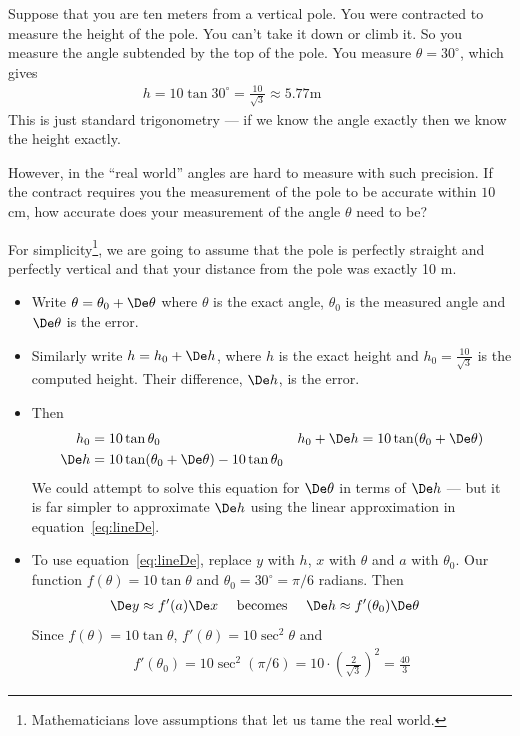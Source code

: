 \begin{eg}\label{eg:taylorPole}
Suppose that you are ten meters from a vertical pole. You were
contracted to measure the height of the pole. You can't
take it down or climb it. So you measure the angle subtended by
the top of the pole. You measure $\theta=30^\circ$,  which gives
\begin{align*}
h=10\tan 30^\circ=\tfrac{10}{\sqrt{3}}\approx 5.77\text{m}\qquad\qquad
\end{align*}
This is just standard trigonometry ---  if we know the angle exactly then we know the
height exactly.

However, in the ``real world'' angles are hard to measure with such precision. If the
contract requires you the measurement of the pole to be accurate within $10$ cm, how
accurate does your measurement of the angle $\theta$ need to be?

\soln For simplicity\footnote{Mathematicians love assumptions that let us tame the real
world.}, we are going to assume that the pole is perfectly straight
and perfectly vertical and that your distance from the pole was exactly
10 m.
\begin{itemize}
\item Write $\theta=\theta_0+\De\theta$ where $\theta$ is the exact angle, $\theta_0$ is
the measured angle and $\De \theta$ is the error.
\item Similarly write $h=h_0+\De h$, where $h$ is the exact height and
$h_0=\tfrac{10}{\sqrt{3}}$ is the computed height. Their difference,
$\De h$, is the error.

\item Then
\begin{align*}
h_0&=10\tan\theta_0 & h_0+\De h&=10\tan(\theta_0+\De\theta)\\
\De h &= 10\tan(\theta_0+\De\theta) - 10\tan\theta_0
\end{align*}
We could attempt to solve this equation for $\De\theta$ in terms of $\De h$ --- but it is
far simpler to approximate $\De h$ using the linear approximation in
equation~\ref{eq:lineDe}.

\item To use equation~\ref{eq:lineDe}, replace $y$ with $h$, $x$ with $\theta$ and $a$
with $\theta_0$. Our function $f(\theta) = 10 \tan\theta$ and $\theta_0 = 30^\circ =
\pi/6$ radians. Then
\begin{align*}
  \De y &\approx f'(a) \De x & \text{ becomes }&&
  \De h &\approx f'(\theta_0) \De \theta
\end{align*}
Since $f(\theta)=10 \tan \theta$, $f'(\theta) = 10\sec^2\theta$ and
\begin{align*}
  f'(\theta_0) = 10\sec^2(\pi/6)
  = 10 \cdot \left(\frac{2}{\sqrt{3}} \right)^2 = \frac{40}{3}
\end{align*}


\end{itemize}
\end{eg}
